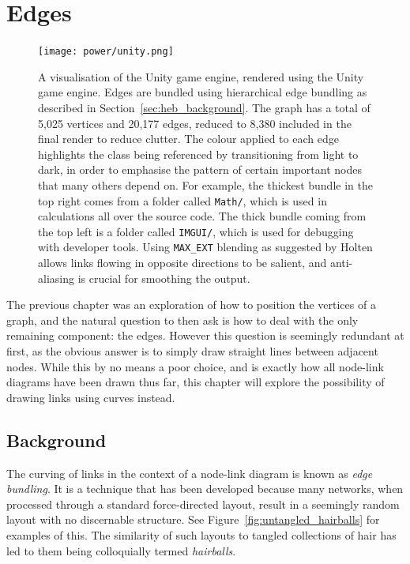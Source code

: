 \chapter{Edges}
\label{chap:power}
\begin{figure}
  \centering
  \texttt{[image: power/unity.png]}
  \caption[The Unity game engine, visualised using the Unity game engine]{A visualisation of the Unity game engine, rendered using the Unity game engine. 
  Edges are bundled using hierarchical edge bundling as described in Section~\ref{sec:heb_background}. The graph has a total of 5,025 vertices and 20,177 edges, reduced to 8,380 included in the final render to reduce clutter. The colour applied to each edge highlights the class being referenced by transitioning from light to dark, in order to emphasise the pattern of certain important nodes that many others depend on. For example, the thickest bundle in the top right comes from a folder called \texttt{Math/}, which is used in calculations all over the source code. The thick bundle coming from the top left is a folder called \texttt{IMGUI/}, which is used for debugging with developer tools.
  Using \texttt{MAX\_EXT} blending as suggested by Holten \cite{Holten2006} allows links flowing in opposite directions to be salient, and anti-aliasing is crucial for smoothing the output.}
  \label{fig:metaunity}
\end{figure}
The previous chapter was an exploration of how to position the vertices of a graph, and the natural question to then ask is how to deal with the only remaining component: the edges. However this question is seemingly redundant at first, as the obvious answer is to simply draw straight lines between adjacent nodes. While this by no means a poor choice, and is exactly how all node-link diagrams have been drawn thus far, this chapter will explore the possibility of drawing links using curves instead.

\section{Background}
\label{sec:edges_background}
The curving of links in the context of a node-link diagram is known as \textit{edge bundling}. It is a technique that has been developed because many networks, when processed through a standard force-directed layout, result in a seemingly random layout with no discernable structure. See Figure~\ref{fig:untangled_hairballs} for examples of this. The similarity of such layouts to tangled collections of hair has led to them being colloquially termed \textit{hairballs}.

